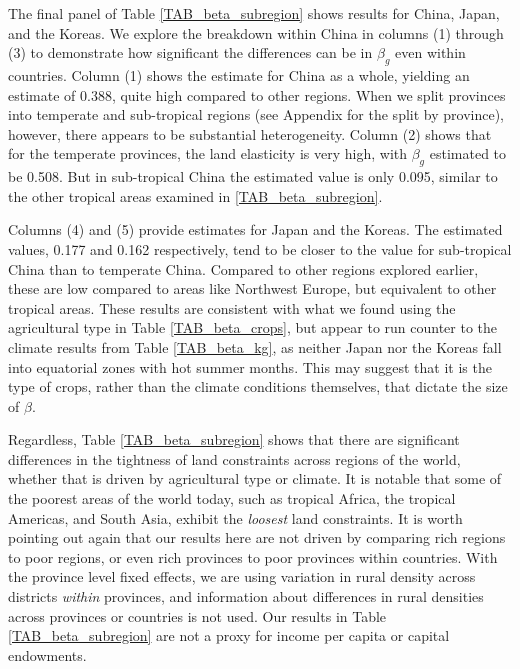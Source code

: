 The final panel of Table \ref{TAB_beta_subregion} shows results for China, Japan, and the Koreas. We explore the breakdown within China in columns (1) through (3) to demonstrate how significant the differences can be in $\beta_g$ even within countries. Column (1) shows the estimate for China as a whole, yielding an estimate of 0.388, quite high compared to other regions. When we split provinces into temperate and sub-tropical regions (see Appendix for the split by province), however, there appears to be substantial heterogeneity. Column (2) shows that for the temperate provinces, the land elasticity is very high, with $\beta_g$ estimated to be 0.508. But in sub-tropical China the estimated value is only 0.095, similar to the other tropical areas examined in \ref{TAB_beta_subregion}.

Columns (4) and (5) provide estimates for Japan and the Koreas. The estimated values, 0.177 and 0.162 respectively, tend to be closer to the value for sub-tropical China than to temperate China. Compared to other regions explored earlier, these are low compared to areas like Northwest Europe, but equivalent to other tropical areas. These results are consistent with what we found using the agricultural type in Table \ref{TAB_beta_crops}, but appear to run counter to the climate results from Table \ref{TAB_beta_kg}, as neither Japan nor the Koreas fall into equatorial zones with hot summer months. This may suggest that it is the type of crops, rather than the climate conditions themselves, that dictate the size of $\beta$.

Regardless, Table \ref{TAB_beta_subregion} shows that there are significant differences in the tightness of land constraints across regions of the world, whether that is driven by agricultural type or climate. It is notable that some of the poorest areas of the world today, such as tropical Africa, the tropical Americas, and South Asia, exhibit the \textit{loosest} land constraints. It is worth pointing out again that our results here are not driven by comparing rich regions to poor regions, or even rich provinces to poor provinces within countries. With the province level fixed effects, we are using variation in rural density across districts \textit{within} provinces, and information about differences in rural densities across provinces or countries is not used. Our results in Table \ref{TAB_beta_subregion} are not a proxy for income per capita or capital endowments.




